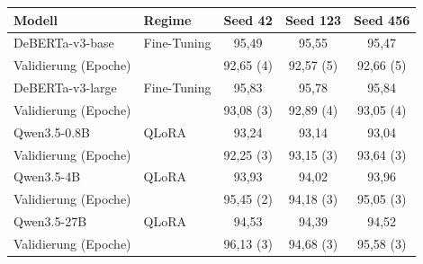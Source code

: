 \begin{tabular}{llccc}
    \toprule
    \textbf{Modell} & \textbf{Regime} & \textbf{Seed 42} & \textbf{Seed 123} & \textbf{Seed 456} \\
    \midrule
    DeBERTa-v3-base & Fine-Tuning & 95,49 & 95,55 & 95,47 \\
    \quad Validierung (Epoche) & & 92,65 (4) & 92,57 (5) & 92,66 (5) \\
    DeBERTa-v3-large & Fine-Tuning & 95,83 & 95,78 & 95,84 \\
    \quad Validierung (Epoche) & & 93,08 (3) & 92,89 (4) & 93,05 (4) \\
    Qwen3.5-0.8B & QLoRA & 93,24 & 93,14 & 93,04 \\
    \quad Validierung (Epoche) & & 92,25 (3) & 93,15 (3) & 93,64 (3) \\
    Qwen3.5-4B & QLoRA & 93,93 & 94,02 & 93,96 \\
    \quad Validierung (Epoche) & & 95,45 (2) & 94,18 (3) & 95,05 (3) \\
    Qwen3.5-27B & QLoRA & 94,53 & 94,39 & 94,52 \\
    \quad Validierung (Epoche) & & 96,13 (3) & 94,68 (3) & 95,58 (3) \\
    \bottomrule
\end{tabular}
